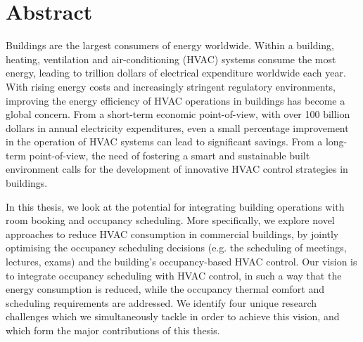 \chapter*{Abstract}
\vspace{-1em}

Buildings are the largest consumers of energy worldwide. Within a building, heating, ventilation and air-conditioning (HVAC) systems consume the most energy, leading to trillion dollars of electrical expenditure worldwide each year. With rising energy costs and increasingly stringent regulatory environments, improving the energy efficiency of HVAC operations in buildings has become a global concern. From a short-term economic point-of-view, with over 100 billion dollars in annual electricity expenditures, even a small percentage improvement in the operation of HVAC systems can lead to significant savings. From a long-term point-of-view, the need of fostering a smart and sustainable built environment calls for the development of innovative HVAC control strategies in buildings.

In this thesis, we look at the potential for integrating building operations with room booking and occupancy scheduling. More specifically, we explore novel approaches to reduce HVAC consumption in commercial buildings, by jointly optimising the occupancy scheduling decisions (e.g. the scheduling of meetings, lectures, exams) and the building's occupancy-based HVAC control. Our vision is to integrate occupancy scheduling with HVAC control, in such a way that the energy consumption is reduced, while the occupancy thermal comfort and scheduling requirements are addressed. We identify four unique research challenges which we simultaneously tackle in order to achieve this vision, and which form the major contributions of this thesis.


